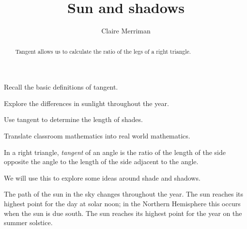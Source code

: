 \documentclass[noauthor,nooutcomes,handout,hints]{ximera}
\title{Sun and shadows} \author{Claire Merriman}
\begin{document}
\begin{abstract}
Tangent allows us to calculate the ratio of the legs of a right triangle.
\end{abstract}
\maketitle

\begin{listOutcomes}
\item  Recall the basic definitions of tangent.
\item Explore the differences in sunlight throughout the year.
\item Use tangent to determine the length of shades.
\item Translate classroom mathematics into real world mathematics.
\end{listOutcomes}


\mynewpage


\begin{definition}
 In a right triangle, \emph{tangent} of an angle is the ratio of the length of the side opposite the angle to the length of the side adjacent to the angle. 
\end{definition}
We will use this to explore some ideas around shade and shadows.

The path of the sun in the sky changes throughout the year. The sun reaches its highest point for the day at solar noon; in the Northern Hemisphere this occurs when the sun is due south. The sun reaches its highest point for the year on the summer solstice.

\begin{center}
 
\end{center}
\end{document}

